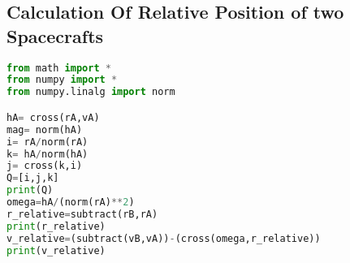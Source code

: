 \subsection{Calculation Of Relative Position of two Spacecrafts}
\begin{lstlisting}[language=python, caption=CoSV.py]
from math import *
from numpy import *
from numpy.linalg import norm

hA= cross(rA,vA)
mag= norm(hA)
i= rA/norm(rA)
k= hA/norm(hA)
j= cross(k,i)
Q=[i,j,k]
print(Q)
omega=hA/(norm(rA)**2)
r_relative=subtract(rB,rA)
print(r_relative)
v_relative=(subtract(vB,vA))-(cross(omega,r_relative))
print(v_relative)
\end{lstlisting}